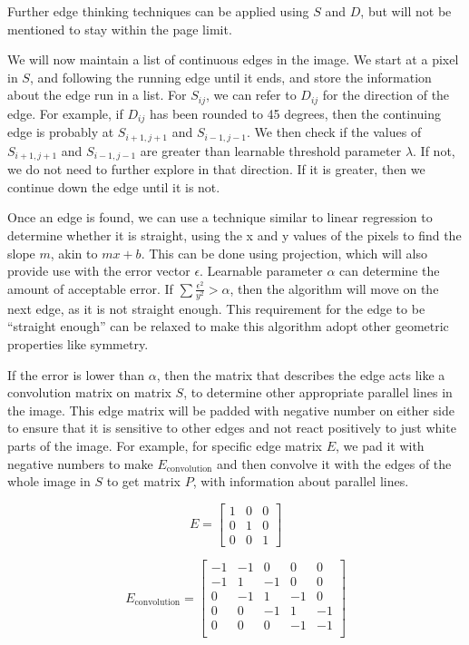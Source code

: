 \documentclass{article}
\begin{document}
Further edge thinking techniques can be applied using $S$ and $D$, but will not be mentioned to stay within the page limit.

We will now maintain a list of continuous edges in the image. We start at a
pixel in $S$, and following the running edge until it ends, and store the
information about the edge run in a list. For $S_{ij}$, we can refer to
$D_{ij}$ for the direction of the edge. For example, if $D_{ij}$ has been
rounded to 45 degrees, then the continuing edge is probably at $S_{i+1, j + 1}$
and $S_{i-1, j-1}$. We then check if the values of $S_{i+1, j+1}$ and $S_{i-1,
j-1}$ are greater than learnable threshold parameter $\lambda$. If not, we do
not need to further explore in that direction. If it is greater, then we
continue down the edge until it is not.

Once an edge is found, we can use a technique similar to linear regression to
determine whether it is straight, using the x and y values of the pixels to
find the slope $m$, akin to $mx + b$. This can be done using projection, which
will also provide use with the error vector $\epsilon$.  Learnable parameter
$\alpha$ can determine the amount of acceptable error. If $\sum
\frac{\epsilon^2}{y^2} > \alpha$, then the algorithm will move on the next
edge, as it is not straight enough. This requirement for the edge to be
``straight enough'' can be relaxed to make this algorithm adopt other geometric properties like symmetry.

If the error is lower than $\alpha$, then the matrix that describes the edge
acts like a convolution matrix on matrix $S$, to determine other appropriate
parallel lines in the image. This edge matrix will be padded with negative
number on either side to ensure that it is sensitive to other edges and not
react positively to just white parts of the image. For example, for specific
edge matrix $E$, we pad it with negative numbers to make $E_\text{convolution}$
and then convolve it with the edges of the whole image in $S$ to get matrix $P$, with information about parallel lines.

$$E = \begin{bmatrix}
  1 & 0 & 0 \\
  0 & 1 & 0 \\
  0 & 0 & 1
\end{bmatrix}$$


$$E_\text{convolution} = \begin{bmatrix}
  -1 & -1 & 0 & 0 & 0\\
  -1 & 1  & -1 & 0 & 0 \\
  0  & -1 & 1 & -1 & 0 \\
  0  & 0  & -1 & 1 & -1 \\
  0  & 0  & 0 & -1 & -1 \\
\end{bmatrix}$$
\end{document}
